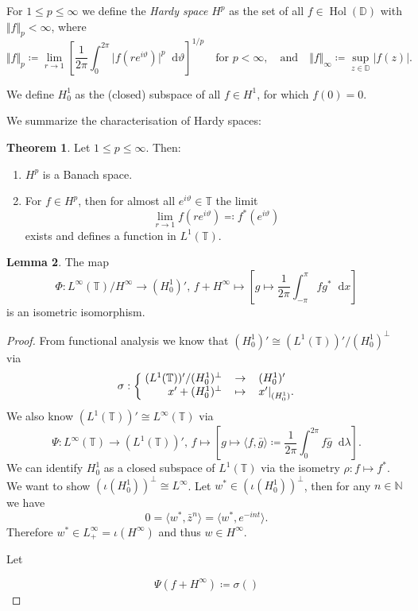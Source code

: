 \documentclass[letterpaper, 11pt]{article}
\makeatletter
\newcommand{\D}{\mathbb{D}}
\newcommand{\T}{\mathbb{T}}
\newcommand{\N}{\mathbb{N}}
\newcommand{\1}{\mathds{1}}
\newcommand{\diff}{\mathop{}\!\mathrm{d}}
\newcommand{\mapping}[3]{
  \ensuremath{
    #1 : \left\{
    \begin{array}{@{\;}r@{\hspace{0.4cm}}c@{\hspace{0.4cm}}l@{}}
      #2 \\
      #3
    \end{array}
    \right.
  }
}
\newcommand{\restr}[2]{{%
  \left.\kern-\nulldelimiterspace %
  #1 %
  \littletaller %
  \right|_{#2} %
  }}
\newcommand{\littletaller}{\mathchoice{\vphantom{\big|}}{}{}{}}
\DeclareMathOperator*{\Hol}{Hol}
\theoremstyle{definition}
\newtheorem{theorem}{Theorem}
\newtheorem{lemma}[theorem]{Lemma}
\makeatother
\begin{document}
For $1 \leq p \leq \infty$ we define the \emph{Hardy space} $H^p$ as the set of all $f \in \Hol(\D)$ with $\Vert f \Vert_p < \infty$, where
$$ \Vert f \Vert_p \coloneqq \lim_{r \to 1} \left[ \frac{1}{2 \pi} \int_0^{2 \pi} \vert f(r e^{i \vartheta}) \vert^p \diff \vartheta \right]^{1/p} \quad \textrm{for } p < \infty, \quad \textrm{and} \quad \Vert f \Vert_\infty \coloneqq \sup_{z \in \D} \vert f(z) \vert. $$

We define $H_0^1$ as the (closed) subspace of all $f \in H^1$, for which $f(0) = 0$.

We summarize the characterisation of Hardy spaces:
\begin{theorem} Let $1 \leq p \leq \infty$. Then:
  \begin{enumerate}
    \item $H^p$ is a Banach space.
    \item For $f \in H^p$, then for almost all $e^{i \vartheta} \in \T$ the limit
    $$ \lim_{r \to 1} f(re^{i \vartheta}) \eqqcolon f^*(e^{i \vartheta}) $$
    exists and defines a function in $L^1(\T)$.
  \end{enumerate}
\end{theorem}

\begin{lemma}
  The map
  \begin{equation*}
    \Phi : L^\infty(\T) / H^\infty \to (H_0^1)',\, f + H^\infty \mapsto \left[ g \mapsto \frac{1}{2 \pi} \int_{-\pi}^\pi f g^* \diff x \right]
  \end{equation*}
  is an isometric isomorphism.
\end{lemma}

\begin{proof}
  From functional analysis we know that $ (H_0^1)' \cong (L^1(\T))'/(H_0^1)^\perp $ via
  $$ \mapping{\sigma}{(L^1(\T))'/(H_0^1)^\perp & \to & (H_0^1)'}{x' + (H_0^1)^\perp & \mapsto & \restr{x'}{(H_0^1)}.} $$
  We also know $(L^1(\T))' \cong L^\infty(\T)$ via
  $$ \Psi : L^\infty(\T) \to (L^1(\T))',\, f \mapsto \left[ g \mapsto \langle f, \bar{g} \rangle \coloneqq \frac{1}{2 \pi} \int_0^{2 \pi} f \bar{g} \diff \lambda \right]. $$
  We can identify $H_0^1$ as a closed subspace of $L^1(\T)$ via the isometry $\rho : f \mapsto f^*$. We want to show $(\iota(H_0^1))^\perp \cong L^\infty$. Let $w^* \in (\iota(H_0^1))^\perp$, then for any $n \in \N$ we have
  $$ 0 = \langle w^*, \bar{z}^n \rangle = \langle w^*, e^{-i n t} \rangle. $$
  Therefore $w^* \in L_+^\infty = \iota(H^\infty)$ and thus $w \in H^\infty$.

  Let

  $$ \Psi(f + H^\infty) \coloneqq \sigma() $$
\end{proof}
\end{document}
